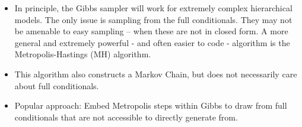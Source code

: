 %  
% 
% 
% 
% 

\begin{frame}

\begin{itemize}\setlength{\itemsep}{0.5cm}
\item In principle, the Gibbs sampler will work for extremely
complex hierarchical models. The only issue is sampling from the
full conditionals. They may not be amenable to easy sampling --
when these are not in closed form. A more general and extremely
powerful - and often easier to code - algorithm is the
Metropolis-Hastings (MH) algorithm.

\item This algorithm also constructs a Markov Chain, but does not necessarily care about full conditionals.

\item Popular approach: Embed Metropolis steps within Gibbs to draw from full conditionals that are not accessible to directly generate from. 
\end{itemize}

\end{frame}

